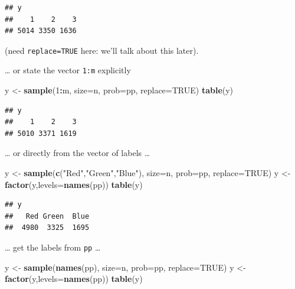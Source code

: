 \documentclass[
]{book}
\newenvironment{Shaded}{\begin{snugshade}}{\end{snugshade}}
\newcommand{\AttributeTok}[1]{\textcolor[rgb]{0.13,0.29,0.53}{#1}}
\newcommand{\ConstantTok}[1]{\textcolor[rgb]{0.56,0.35,0.01}{#1}}
\newcommand{\DecValTok}[1]{\textcolor[rgb]{0.00,0.00,0.81}{#1}}
\newcommand{\FunctionTok}[1]{\textcolor[rgb]{0.13,0.29,0.53}{\textbf{#1}}}
\newcommand{\NormalTok}[1]{#1}
\newcommand{\OtherTok}[1]{\textcolor[rgb]{0.56,0.35,0.01}{#1}}
\newcommand{\SpecialCharTok}[1]{\textcolor[rgb]{0.81,0.36,0.00}{\textbf{#1}}}
\newcommand{\StringTok}[1]{\textcolor[rgb]{0.31,0.60,0.02}{#1}}
\begin{document}
\begin{verbatim}
## y
##    1    2    3 
## 5014 3350 1636
\end{verbatim}

(need \texttt{replace=TRUE} here: we'll talk about this later).

\ldots{} or state the vector \texttt{1:m} explicitly

\begin{Shaded}
\begin{Highlighting}[]
\NormalTok{y }\OtherTok{\textless{}{-}} \FunctionTok{sample}\NormalTok{(}\DecValTok{1}\SpecialCharTok{:}\NormalTok{m, }\AttributeTok{size=}\NormalTok{n, }\AttributeTok{prob=}\NormalTok{pp, }\AttributeTok{replace=}\ConstantTok{TRUE}\NormalTok{)}
\FunctionTok{table}\NormalTok{(y)}
\end{Highlighting}
\end{Shaded}

\begin{verbatim}
## y
##    1    2    3 
## 5010 3371 1619
\end{verbatim}

\ldots{} or directly from the vector of labels \ldots{}

\begin{Shaded}
\begin{Highlighting}[]
\NormalTok{y }\OtherTok{\textless{}{-}} \FunctionTok{sample}\NormalTok{(}\FunctionTok{c}\NormalTok{(}\StringTok{"Red"}\NormalTok{,}\StringTok{"Green"}\NormalTok{,}\StringTok{"Blue"}\NormalTok{), }\AttributeTok{size=}\NormalTok{n, }\AttributeTok{prob=}\NormalTok{pp, }\AttributeTok{replace=}\ConstantTok{TRUE}\NormalTok{)}
\NormalTok{y }\OtherTok{\textless{}{-}} \FunctionTok{factor}\NormalTok{(y,}\AttributeTok{levels=}\FunctionTok{names}\NormalTok{(pp))}
\FunctionTok{table}\NormalTok{(y)}
\end{Highlighting}
\end{Shaded}

\begin{verbatim}
## y
##   Red Green  Blue 
##  4980  3325  1695
\end{verbatim}

\ldots{} get the labels from \texttt{pp} \ldots{}

\begin{Shaded}
\begin{Highlighting}[]
\NormalTok{y }\OtherTok{\textless{}{-}} \FunctionTok{sample}\NormalTok{(}\FunctionTok{names}\NormalTok{(pp), }\AttributeTok{size=}\NormalTok{n, }\AttributeTok{prob=}\NormalTok{pp, }\AttributeTok{replace=}\ConstantTok{TRUE}\NormalTok{)}
\NormalTok{y }\OtherTok{\textless{}{-}} \FunctionTok{factor}\NormalTok{(y,}\AttributeTok{levels=}\FunctionTok{names}\NormalTok{(pp))}
\FunctionTok{table}\NormalTok{(y)}
\end{Highlighting}
\end{Shaded}
\end{document}
